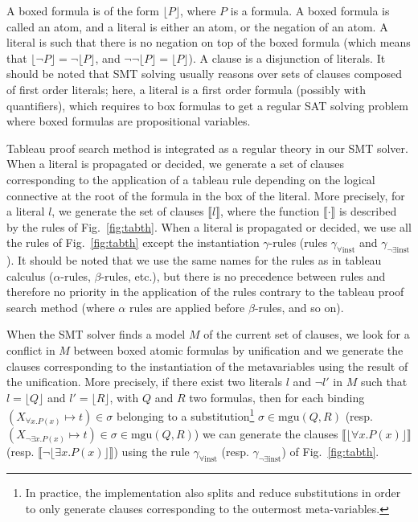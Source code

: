 A boxed formula is of the form $\lfloor{}P\rfloor$, where $P$ is a formula. A
boxed formula is called an atom, and a literal is either an atom, or the negation
of an atom. A literal is such that there is no negation on top of the boxed
formula (which means that $\lfloor\neg{}P\rfloor=\neg\lfloor{}P\rfloor$, and
$\neg\neg\lfloor{}P\rfloor=\lfloor{}P\rfloor$). A clause is a disjunction of
literals. It should be noted that SMT solving usually reasons over sets of
clauses composed of first order literals; here, a literal is a first order
formula (possibly with quantifiers), which requires to box formulas to get a
regular SAT solving problem where boxed formulas are propositional variables.

Tableau proof search method is integrated as a regular theory in our SMT solver.
When a literal is propagated or decided, we
generate a set of clauses corresponding to the application of a tableau rule
depending on the logical connective at the root of the formula in the box of the
literal. More precisely, for a literal $l$, we generate the set of clauses
$\llbracket{}l\rrbracket$, where the function $\llbracket\cdot\rrbracket$ is
described by the rules of Fig.~\ref{fig:tabth}. When a literal is propagated or
decided, we use all the rules of Fig.~\ref{fig:tabth} except the instantiation
$\gamma$-rules (rules $\gamma_{\forall\mathrm{inst}}$ and
$\gamma_{\neg\exists\mathrm{inst}}$). It should be noted that we use the same
names for the rules as in tableau calculus ($\alpha$-rules, $\beta$-rules,
etc.), but there is no precedence between rules and therefore no priority in the
application of the rules contrary to the tableau proof search method (where
$\alpha$ rules are applied before $\beta$-rules, and so on).

When the SMT solver finds a model $M$ of the current set of clauses,
we look for a conflict in $M$ between boxed atomic formulas by unification and we
generate the clauses corresponding to the instantiation of the metavariables
using the result of the unification. More precisely, if there exist two literals
$l$ and $\neg{}l'$ in $M$ such that $l=\lfloor{}Q\rfloor$ and
$l'=\lfloor{}R\rfloor$, with $Q$ and $R$ two formulas, then for each binding
$(X_{\forall{}x.P(x)}\mapsto{}t)\in\sigma$ belonging to a
substitution\footnote{In practice, the implementation also splits and
reduce substitutions in order to only generate clauses corresponding to the
outermost meta-variables.}
$\sigma\in\mathrm{mgu}(Q,R)$ (resp.
$(X_{\neg\exists{}x.P(x)}\mapsto{}t)\in\sigma\in\mathrm{mgu}(Q,R)$)
we can generate the clauses $\llbracket\lfloor\forall{}x.P(x)\rfloor{}\rrbracket$
(resp. $\llbracket\neg\lfloor\exists{}x.P(x)\rfloor{}\rrbracket$) using the rule
$\gamma_{\forall\mathrm{inst}}$ (resp. $\gamma_{\neg\exists\mathrm{inst}}$) of
Fig.~\ref{fig:tabth}.

